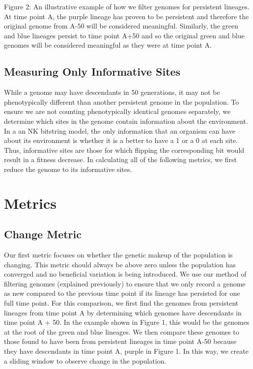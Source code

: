 \documentclass[letterpaper]{article}
\begin{document}
Figure 2: An illustrative example of how we filter genomes for persistent lineages. At time point A, the purple lineage has proven to be persistent and therefore the original genome from A-50 will be considered meaningful. Similarly, the green and blue lineages persist to time point A+50 and so the original green and blue genomes will be considered meaningful as they were at time point A.

\subsection{Measuring Only Informative Sites}
    While a genome may have descendants in 50 generations, it may not be phenotypically different than another persistent genome in the population. To ensure we are not counting phenotypically identical genomes separately, we determine which sites in the genome contain information about the environment. In a an NK bitstring model, the only information that an organism can have about its environment is whether it is a better to have a 1 or a 0 at each site. Thus, informative sites are those for which flipping the corresponding bit would result in a fitness decrease. In calculating all of the following metrics, we first reduce the genome to its informative sites.

\section{Metrics}

\subsection{Change Metric}
    Our first metric focuses on whether the genetic makeup of the population is changing. This metric should always be above zero unless the population has converged and no beneficial variation is being introduced. We use our method of filtering genomes (explained previously) to ensure that we only record a genome as new compared to the previous time point if its lineage has persisted for one full time point. For this comparison, we first find the genomes from persistent lineages from time point A by determining which genomes have descendants in time point A + 50. In the example shown in Figure 1, this would be the genomes at the root of the green and blue lineages. We then compare these genomes to those found to have been from persistent lineages in time point A-50 because they have descendants in time point A, purple in Figure 1. In this way, we create a sliding window to observe change in the population.
\end{document}
